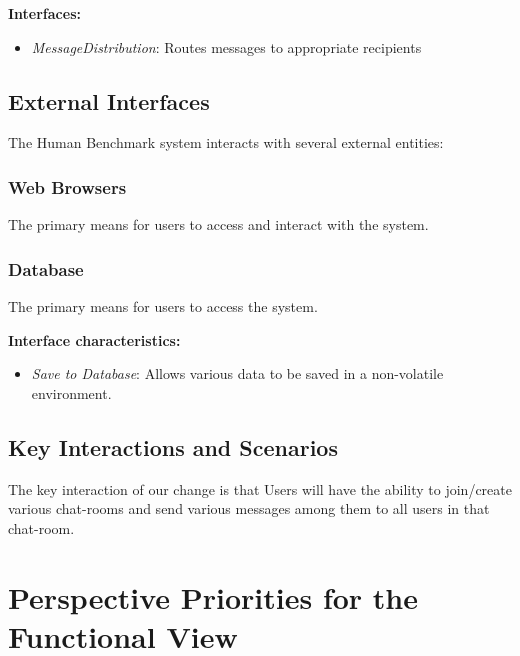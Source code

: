 \textbf{Interfaces:}
\begin{itemize}
    \item \textit{MessageDistribution}: Routes messages to appropriate recipients
\end{itemize}

\subsection{External Interfaces}

The Human Benchmark system interacts with several external entities:

\subsubsection{Web Browsers}
The primary means for users to access and interact with the system.


\subsubsection{Database}
The primary means for users to access the system.

\textbf{Interface characteristics:}
\begin{itemize}
    \item \textit{Save to Database}: Allows various data to be saved in a non-volatile environment.

\end{itemize}


\subsection{Key Interactions and Scenarios}

The key interaction of our change is that Users will have the ability to join/create various chat-rooms and send various messages among them to all users in that chat-room.

\section{Perspective Priorities for the Functional View}

